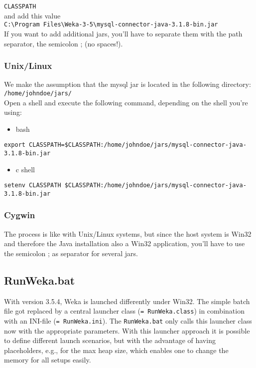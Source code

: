 \verb=CLASSPATH=\\

\noindent and add this value\\

\verb=C:\Program Files\Weka-3-5\mysql-connector-java-3.1.8-bin.jar=\\

\noindent If you want to add additional jars, you'll have to separate them with the path separator, the semicolon ; (no spaces!). 

\subsubsection*{Unix/Linux}

We make the assumption that the mysql jar is located in the following directory:\\

\verb=/home/johndoe/jars/=\\

\noindent Open a shell and execute the following command, depending on the shell you're using:

\begin{itemize}
\item bash
\end{itemize}

\verb_export CLASSPATH=$CLASSPATH:/home/johndoe/jars/mysql-connector-java-3.1.8-bin.jar_

\begin{itemize}
\item c shell
\end{itemize}

\verb_setenv CLASSPATH $CLASSPATH:/home/johndoe/jars/mysql-connector-java-3.1.8-bin.jar_

\subsubsection*{Cygwin}

The process is like with Unix/Linux systems, but since the host system
is Win32 and therefore the Java installation also a Win32 application,
you'll have to use the semicolon ; as separator for several jars.

\subsection{RunWeka.bat}
\label{RunWeka.ini}

With version 3.5.4, Weka is launched differently under Win32. The
simple batch file got replaced by a central launcher class
(\verb_= RunWeka.class_) in combination with an INI-file
 (\verb_= RunWeka.ini_). The \verb=RunWeka.bat= only calls this
 launcher class now with the appropriate parameters. With this
 launcher approach it is possible to define different launch
 scenarios, but with the advantage of having placeholders, e.g., for
 the max heap size, which enables one to change the memory for all
 setups easily.

